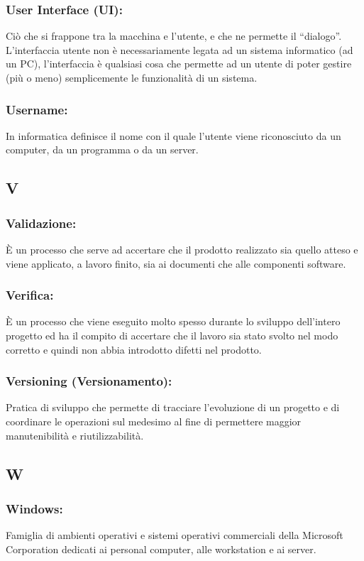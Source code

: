 \subsubsection*{User Interface (UI):}
Ci\`o che si frappone tra la macchina e l'utente, e che ne permette il
``dialogo''. L'interfaccia utente non \`e necessariamente legata ad un sistema
informatico (ad un PC), l'interfaccia \`e qualsiasi cosa che permette ad un utente di poter gestire (pi\`u o meno) semplicemente le funzionalit\`a di
un sistema.

\subsubsection*{Username:} In informatica definisce il nome con il quale
l'utente viene riconosciuto da un computer, da un programma o da un server.

\subsection*{\huge{V}} 
\subsubsection*{Validazione:}
\`E un processo che serve ad accertare che il prodotto realizzato sia quello
atteso e viene applicato, a lavoro finito, sia ai documenti che alle componenti
software.

\subsubsection*{Verifica:}
\`E un processo che viene eseguito molto spesso durante lo sviluppo dell'intero
progetto ed ha il compito di accertare che il lavoro sia stato svolto nel modo
corretto e quindi non abbia introdotto difetti nel prodotto.

\subsubsection*{Versioning (Versionamento):} Pratica di sviluppo che permette di
tracciare l'evoluzione di un progetto e di coordinare le operazioni sul medesimo
al fine di permettere maggior manutenibilit\`a e riutilizzabilit\`a.

\subsection*{\huge{W}}
\subsubsection*{Windows:} Famiglia di ambienti operativi e sistemi operativi
commerciali della Microsoft Corporation dedicati ai personal computer, alle workstation e ai server.

